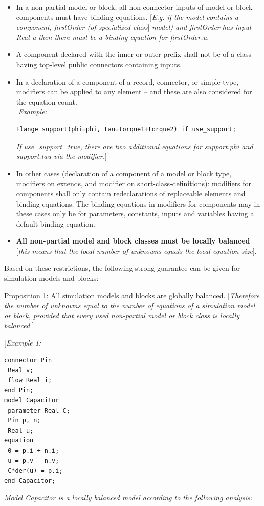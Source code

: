\documentclass[10pt,a4paper]{report}
\def\Mcomment#1{{[}\emph{#1}{]}}
\def\Mcommentbegin#1{{[}\emph{#1}}
\def\Mcommentend#1{\emph{#1}{]}}
\def\Mcommentmid#1{\emph{#1}}
\begin{document}
\begin{itemize}
\item
  In a non-partial model or block, all non-connector inputs of model or
  block components must have binding equations. \Mcomment{E.g. if the
  model contains a component, \emph{firstOrder} (of specialized class}
  \emph{model) and \emph{firstOrder} has \emph{input Real u} then
  there must be a binding equation for \emph{firstOrder.u}.}
\item
  A component declared with the inner or outer prefix shall not be of a
  class having top-level public connectors containing inputs.
\item
  In a declaration of a component of a record, connector, or simple
  type, modifiers can be applied to any element -- and these are also
  considered for the equation count.\\
  \Mcommentbegin{Example:}
\begin{lstlisting}[language=modelica]
Flange support(phi=phi, tau=torque1+torque2) if use_support;
\end{lstlisting}
  \Mcommentend{If use\_support=true, there are two additional equations for
  support.phi and support.tau via the modifier.}
\item
  In other cases (declaration of a component of a model or block type,
  modifiers on extends, and modifier on short-class-definitions):
  modifiers for components shall only contain redeclarations of
  replaceable elements and binding equations. The binding equations in
  modifiers for components may in these cases only be for parameters,
  constants, inputs and variables having a default binding equation.
\item
  \textbf{All non-partial model and block classes must be locally
  balanced} \Mcomment{this means that the local number of unknowns equals
  the local equation size}.
\end{itemize}

Based on these restrictions, the following strong guarantee can be given
for simulation models and blocks:

{Proposition 1:}
All simulation models and blocks are globally balanced.
\Mcomment{Therefore the number of unknowns equal to the number of
equations of a simulation model or block, provided that every used
non-partial model or block class is locally balanced.}

\Mcommentbegin{Example 1:}
\begin{lstlisting}[language=modelica]
connector Pin
 Real v;
 flow Real i;
end Pin;
model Capacitor
 parameter Real C;
 Pin p, n;
 Real u;
equation
 0 = p.i + n.i;
 u = p.v - n.v;
 C*der(u) = p.i;
end Capacitor;
\end{lstlisting}
\Mcommentmid{Model \emph{Capacitor} is a locally balanced model according to
the following analysis:}
\end{document}
